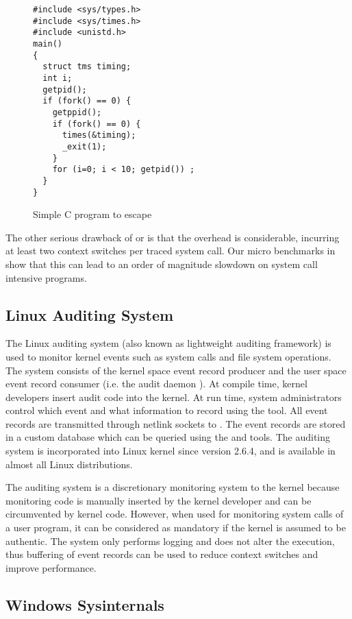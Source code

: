 \begin{figure}[htb]
\begin{verbatim}
#include <sys/types.h>
#include <sys/times.h>
#include <unistd.h>
main()
{
  struct tms timing;
  int i;
  getpid();
  if (fork() == 0) {
    getppid();
    if (fork() == 0) {
      times(&timing);
      _exit(1);
    }
    for (i=0; i < 10; getpid()) ;
  }
}
\end{verbatim}
\caption{Simple C program to escape }
\label{fig:ptrace-bug}
\end{figure}

The other serious drawback of  or  is that
the overhead is considerable, incurring at least two
context switches per traced system call.
Our micro benchmarks in  show that this can lead to an order of magnitude
slowdown on system call intensive programs.

\subsection{Linux Auditing System}
\label{sec:laudit}

The Linux auditing system (also known as lightweight auditing framework)
is used to monitor kernel events such as system calls and file system
operations.
The system consists of the kernel space event record producer and
the user space event record consumer (i.e. the audit daemon ).
At compile time,
kernel developers insert audit code into the kernel.
At run time, system administrators control which event and what information
to record using the  tool.
All event records are transmitted through netlink sockets to .
The event records are stored in a custom database which can be queried
using the  and  tools.
The auditing system is incorporated into Linux kernel since version 2.6.4,
and is available in almost all Linux distributions.

The auditing system is a discretionary monitoring system to the kernel because
monitoring code is manually inserted by the kernel developer and can
be circumvented by kernel code.
However, when used for monitoring system calls of a user program,
it can be considered as mandatory if the kernel is assumed to be authentic.
The system only performs logging and does not alter the execution,
thus buffering of event records can be used to reduce context switches
and improve performance.

\subsection{Windows Sysinternals}
\label{sec:sysinternals}

